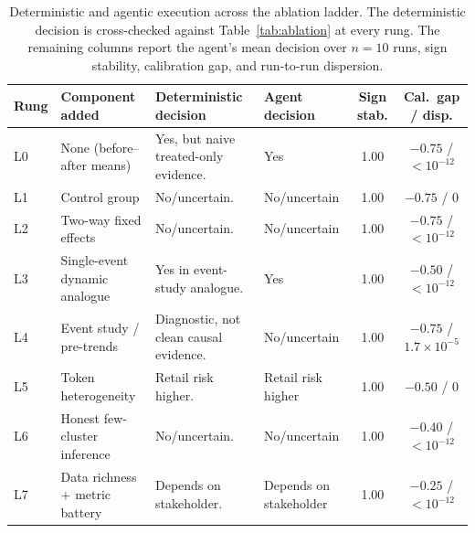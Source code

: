 \begin{table}[t]
\centering
\caption{Deterministic and agentic execution across the ablation ladder. The
deterministic decision is cross-checked against Table~\ref{tab:ablation} at
every rung. The remaining columns report the agent's mean decision over
$n=10$ runs, sign stability, calibration gap, and run-to-run dispersion.}
\label{tab:arms}
\footnotesize
\setlength{\tabcolsep}{3pt}
\begin{tabularx}{\textwidth}{@{}l>{\raggedright\arraybackslash}X>{\raggedright\arraybackslash}p{}>{\raggedright\arraybackslash}p{}cc@{}}
\toprule
\textbf{Rung} & \textbf{Component added} & \textbf{Deterministic decision} & \textbf{Agent decision} &
\textbf{Sign stab.} & \textbf{Cal.\ gap / disp.} \\
\midrule
L0 & None (before--after means) & Yes, but naive treated-only evidence. & Yes & 1.00 & $-0.75$ / $<10^{-12}$ \\
L1 & Control group & No/uncertain. & No/uncertain & 1.00 & $-0.75$ / 0 \\
L2 & Two-way fixed effects & No/uncertain. & No/uncertain & 1.00 & $-0.75$ / $<10^{-12}$ \\
L3 & Single-event dynamic analogue & Yes in event-study analogue. & Yes & 1.00 & $-0.50$ / $<10^{-12}$ \\
L4 & Event study / pre-trends & Diagnostic, not clean causal evidence. & No/uncertain & 1.00 & $-0.75$ / $1.7{\times}10^{-5}$ \\
L5 & Token heterogeneity & Retail risk higher. & Retail risk higher & 1.00 & $-0.50$ / 0 \\
L6 & Honest few-cluster inference & No/uncertain. & No/uncertain & 1.00 & $-0.40$ / $<10^{-12}$ \\
\rowcolor{okgreen!8}
L7 & Data richness + metric battery & Depends on stakeholder. & Depends on stakeholder & 1.00 & $-0.25$ / $<10^{-12}$ \\
\bottomrule
\end{tabularx}
\end{table}
